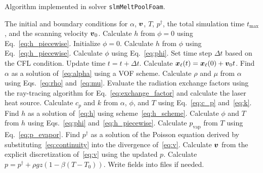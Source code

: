 \documentclass[final]{elsarticle} %
\newcommand{\evapor}[1]{{#1}_\text{vap}}
\newcommand{\laser}{\ell} %
\newcommand{\bv}{\vb*{v}}
\newcommand{\bx}{\vb*{x}}
\begin{document}
\begin{algorithm}
\caption{Algorithm implemented in solver \texttt{slmMeltPoolFoam}.}
\label{alg:slmMeltPoolFoam}
\begin{algorithmic}[1]
    \Require The initial and boundary conditions for $\alpha$, $\bv$, $T$, $p^\dag$,
    the total simulation time $t_\text{max}$, and the scanning velocity $\bv_0$.
    \State Calculate $h$ from $\phi=0$ using Eq.~\eqref{eq:h_piecewise}.
    \State Initialize $\phi=0$.
        \State Calculate $h$ from $\phi$ using Eq.~\eqref{eq:h_piecewise}.
        \State Calculate $\phi$ using Eq.~\eqref{eq:phi}.
    \EndWhile
        \State Set time step $\Delta{t}$ based on the CFL condition.
        \State Update time $t = t + \Delta{t}$.
        \State Calculate $\bx_\laser(t) = \bx_\laser(0) + \bv_0t$.
            \State Find $\alpha$ as a solution of~\eqref{eq:alpha} using a VOF scheme.
            \State Calculate $\rho$ and $\mu$ from $\alpha$ using Eqs.~\eqref{eq:rho} and~\eqref{eq:mu}.
            \State Evaluate the radiation exchange factors using the ray-tracing algorithm
                for Eq.~\eqref{eq:exchange_factor} and calculate the laser heat source.
                \State Calculate $c_p$ and $k$ from $\alpha$, $\phi$, and $T$ using Eq.~\eqref{eq:c_p}
                and~\eqref{eq:k}.
                \State Find $h$ as a solution of~\eqref{eq:h} using scheme~\eqref{eq:h_scheme}.
                \State Calculate $\phi$ and $T$ from $h$ using Eqs.~\eqref{eq:phi} and~\eqref{eq:h_piecewise}.
                \State Calculate $\evapor{p}$ from $T$ using Eq.~\eqref{eq:p_evapor}.
            \EndWhile
                \State Find $p^\dag$ as a solution of the Poisson equation
                derived by substituting~\eqref{eq:continuity} into the divergence of~\eqref{eq:v}.
                \State Calculate $\bv$ from the explicit discretization of~\eqref{eq:v} using the updated $p$.
                \State Calculate $p=p^\dag+\rho gz(1-\beta(T-T_0))$.
            \EndWhile
        \EndWhile
        \State Write fields into files if needed.
    \EndWhile
\end{algorithmic}
\end{algorithm}
\end{document}
